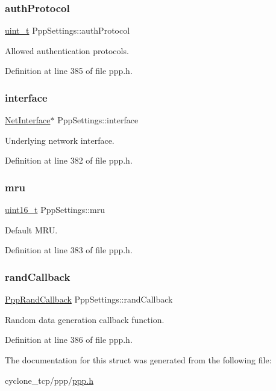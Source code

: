\subsubsection{\texorpdfstring{auth\+Protocol}{authProtocol}}
{\footnotesize\ttfamily \hyperlink{compiler__port_8h_a12a1e9b3ce141648783a82445d02b58d}{uint\+\_\+t} Ppp\+Settings\+::auth\+Protocol}



Allowed authentication protocols. 



Definition at line 385 of file ppp.\+h.

\mbox{\label{structPppSettings_a41a15a72350cde4438f491ddba81008a}} 
\subsubsection{\texorpdfstring{interface}{interface}}
{\footnotesize\ttfamily \hyperlink{net_8h_a2234db8911a1148c9159979d8f5e0d6b}{Net\+Interface}$\ast$ Ppp\+Settings\+::interface}



Underlying network interface. 



Definition at line 382 of file ppp.\+h.

\mbox{\label{structPppSettings_a6a19b72b250787099c5e704dbadcdce0}} 
\subsubsection{\texorpdfstring{mru}{mru}}
{\footnotesize\ttfamily \hyperlink{stdint_8h_a273cf69d639a59973b6019625df33e30}{uint16\+\_\+t} Ppp\+Settings\+::mru}



Default M\+RU. 



Definition at line 383 of file ppp.\+h.

\mbox{\label{structPppSettings_a1c589432617efd3704cfb709256d0210}} 
\subsubsection{\texorpdfstring{rand\+Callback}{randCallback}}
{\footnotesize\ttfamily \hyperlink{ppp_8h_a3f556a989f90c87feeb674ffa97a5827}{Ppp\+Rand\+Callback} Ppp\+Settings\+::rand\+Callback}



Random data generation callback function. 



Definition at line 386 of file ppp.\+h.



The documentation for this struct was generated from the following file\+:\begin{DoxyCompactItemize}
\item 
cyclone\+\_\+tcp/ppp/\hyperlink{ppp_8h}{ppp.\+h}\end{DoxyCompactItemize}
